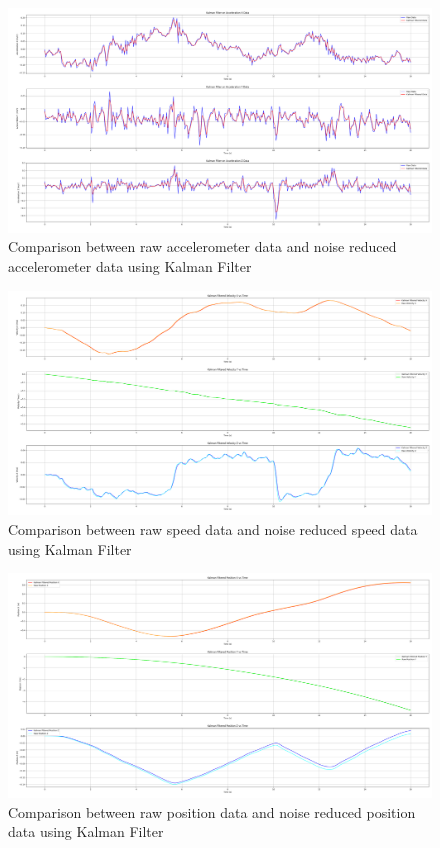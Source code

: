 \documentclass{article}
\begin{document}
    \FloatBarrier
    \begin{figure}[hp]
        \centering
        \includegraphics[height=0.3\textheight]{2_1_8_1.png}
        \caption{Comparison between raw accelerometer data and noise reduced
        accelerometer data using Kalman Filter}
        \label{fig:accel_kalman}
    \end{figure}
    \FloatBarrier
    \begin{figure}[hp]
        \centering
        \includegraphics[height=0.3\textheight]{2_1_8_2.png}
        \caption{Comparison between raw speed data and noise reduced speed data
        using Kalman Filter}
        \label{fig:speed_kalman}
    \end{figure}
    \FloatBarrier
    \begin{figure}[ht]
        \centering
        \includegraphics[height=0.3\textheight]{2_1_8_3.png}
        \caption{Comparison between raw position data and noise reduced position
        data using Kalman Filter}
        \label{fig:position_kalman}
    \end{figure}
\end{document}
